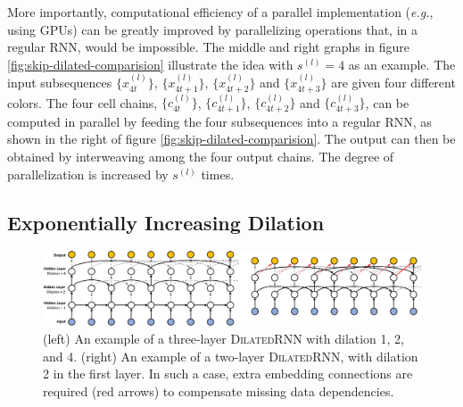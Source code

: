 \documentclass{article}
\newcommand{\algname}{\textsc{DilatedRNN }}
\newcommand{\algnamens}{\textsc{DilatedRNN}}
\begin{document}
More importantly, computational efficiency of a parallel implementation (\emph{e.g.}, using GPUs) can be greatly improved by parallelizing operations that, in a regular RNN, would be impossible. The middle and right graphs in figure \ref{fig:skip-dilated-comparision} illustrate the idea with {\small$s^{(l)} = 4$} as an example. The input subsequences {\small$\{ x_{4t}^{(l)} \}$}, {\small$\{ x_{4t+1}^{(l)} \}$}, {\small$\{ x_{4t+2}^{(l)} \}$} and {\small$\{ x_{4t+3}^{(l)} \}$} are given four different colors. The four cell chains, {\small$\{ c_{4t}^{(l)} \}$}, {\small$\{ c_{4t+1}^{(l)} \}$}, {\small$\{ c_{4t+2}^{(l)} \}$} and {\small$\{ c_{4t+3}^{(l)} \}$}, can be computed in parallel by feeding the four subsequences into a regular RNN, as shown in the right of figure \ref{fig:skip-dilated-comparision}. The output can then be obtained by interweaving among the four output chains. The degree of parallelization is increased by {\small$s^{(l)}$} times.  


\subsection{Exponentially Increasing Dilation}

\begin{figure}[t]
  \centering
  \includegraphics[width=1\textwidth]{./figure/combined_drnn.pdf}
  \vspace*{-0.15in}
  \caption{(left) An example of a three-layer \algname with dilation 1, 2, and 4. (right) An example of a two-layer \algnamens, with dilation 2 in the first layer. In such a case, extra embedding connections are required (red arrows) to compensate missing data dependencies.}
  \label{fig:drnn_example}
  \vspace*{-0.15in}
\end{figure}
\end{document}

